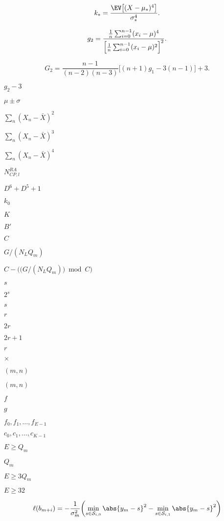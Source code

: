 \documentclass{article}
\begin{document}
\[
k_* = \frac{\EV\bigl[(X-\mu_*)^4\bigr]}{\sigma_*^4}.
\]
\pagebreak

\[
g_2 = \frac{\frac{1}{n}\sum_{i=0}^{n-1}(x_i - \mu)^4}{\Bigl[\frac{1}{n}\sum_{i=0}^{n-1}(x_i - \mu)^2\Bigr]^{2}}.
\]
\pagebreak

\[
G_2 = \frac{n-1}{(n-2)(n-3)}\bigl[(n+1)g_1 - 3(n-1)\bigr] + 3.
\]
\pagebreak

$g_2 - 3$
\pagebreak

$\mu \pm
\sigma$
\pagebreak

$\sum_n (X_n - \bar{X})^2$
\pagebreak

$\sum_n (X_n - \bar{X})^3$
\pagebreak

$\sum_n (X_n - \bar{X})^4$
\pagebreak

$N_{CP,l}^{RA}$
\pagebreak

$D^6 + D^5 + 1$
\pagebreak

$ k_0 $
\pagebreak

$K$
\pagebreak

$B'$
\pagebreak

$C$
\pagebreak

$G / (N_L Q_m)$
\pagebreak

$C - \bigr(\bigl(G / (N_L Q_m)\bigr)
\bmod C\bigr)$
\pagebreak

$ s $
\pagebreak

$2^s$
\pagebreak

$ s$
\pagebreak

$r$
\pagebreak

$2r$
\pagebreak

$ 2r + 1 $
\pagebreak

$ r $
\pagebreak

$\times$
\pagebreak

$(m, n)$
\pagebreak

$(m,n)$
\pagebreak

$f$
\pagebreak

$g$
\pagebreak

$f_0, f_1, \dots, f_{E-1}$
\pagebreak

$c_0, c_1, \dots, c_{K-1}$
\pagebreak

$E \ge Q_m$
\pagebreak

$Q_m$
\pagebreak

$E \ge 3Q_m$
\pagebreak

$E \ge 32$
\pagebreak

\[
\ell(b_{m+i}) = -\frac{1}{\sigma_m^2} \biggl( \min_{s\in \mathcal{S}_{i,0}} \abs{y_m - s}^2
              - \min_{s\in \mathcal{S}_{i,1}} \abs{y_m - s}^2 \biggr)
\]
\pagebreak
\end{document}
